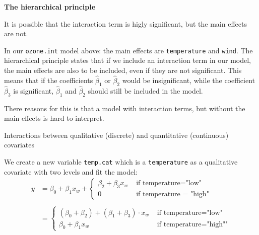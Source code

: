 \documentclass[ignorenonframetext,]{beamer}
\begin{document}
\begin{frame}[fragile]

\textbf{The hierarchical principle}

It is possible that the interaction term is higly significant, but the
main effects are not.

In our \texttt{ozone.int} model above: the main effects are
\texttt{temperature} and \texttt{wind}. The hierarchical principle
states that if we include an interaction term in our model, the main
effects are also to be included, even if they are not significant. This
means that if the coefficients \(\hat \beta_1\) or \(\hat \beta_2\)
would be insignificant, while the coefficient \(\hat \beta_3\) is
significant, \(\hat \beta_1\) and \(\hat \beta_2\) should still be
included in the model.

There reasons for this is that a model with interaction terms, but
without the main effects is hard to interpret.

\end{frame}

\begin{frame}[fragile]

\begin{block}{Interactions between qualitative (discrete) and
quantitative (continuous) covariates}

We create a new variable \texttt{temp.cat} which is a
\texttt{temperature} as a qualitative covariate with two levels and fit
the model:
\[\begin{aligned}y&=\beta_0 + \beta_1 x_w + \begin{cases} \beta_2 + \beta_3  x_w  &\text{ if temperature="low"}\\ 0 &\text{ if temperature = "high"}\end{cases} \\\\ &= \begin{cases} (\beta_0 + \beta_2) + (\beta_1 + \beta_3) \cdot x_w &\text{ if temperature="low"}\\ \beta_0 + \beta_1 x_w &\text{ if temperature="high""} \end{cases} \end{aligned}\]

\end{block}

\end{frame}
\end{document}
